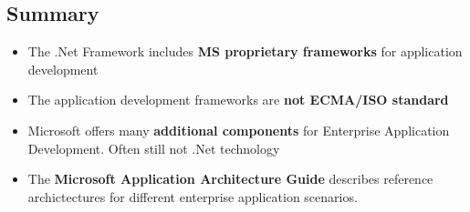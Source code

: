 \documentclass[10pt]{article}
\begin{document}
\subsection{Summary}
\begin{itemize}
	\item The .Net Framework includes \textbf{MS proprietary frameworks} for application development
	\item The application development frameworks are \textbf{not ECMA/ISO standard }
	\item Microsoft offers many \textbf{additional components} for Enterprise Application Development. Often still not .Net technology
	\item The \textbf{Microsoft Application Architecture Guide} describes reference archictectures for different enterprise application scenarios.
\end{itemize}

\pagebreak
\end{document}
